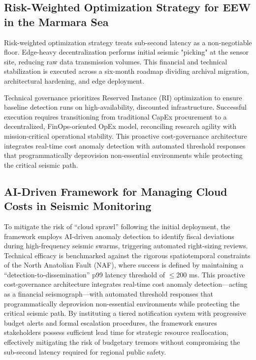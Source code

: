 \documentclass[data,article,accept,pdftex,moreauthors]{Definitions/mdpi}
\begin{document}
\subsection{Risk-Weighted Optimization Strategy for EEW in the Marmara Sea}
Risk-weighted optimization strategy treats sub-second latency as a non-negotiable floor. Edge-heavy decentralization performs initial seismic "picking" at the sensor site, reducing raw data transmission volumes. This financial and technical stabilization is executed across a six-month roadmap dividing archival migration, architectural hardening, and edge deployment.

Technical governance prioritizes Reserved Instance (RI) optimization to ensure baseline detection runs on high-availability, discounted infrastructure. Successful execution requires transitioning from traditional CapEx procurement to a decentralized, FinOps-oriented OpEx model, reconciling research agility with mission-critical operational stability. This proactive cost-governance architecture integrates real-time cost anomaly detection with automated threshold responses that programmatically deprovision non-essential environments while protecting the critical seismic path.

\subsection{AI-Driven Framework for Managing Cloud Costs in Seismic Monitoring}
To mitigate the risk of ``cloud sprawl'' following the initial deployment, the framework employs AI-driven anomaly detection to identify fiscal deviations during high-frequency seismic swarms, triggering automated right-sizing reviews. Technical efficacy is benchmarked against the rigorous spatiotemporal constraints of the North Anatolian Fault (NAF), where success is defined by maintaining a ``detection-to-dissemination'' p99 latency threshold of $\leq$200 ms. This proactive cost-governance architecture integrates real-time cost anomaly detection---acting as a financial seismograph---with automated threshold responses that programmatically deprovision non-essential environments while protecting the critical seismic path. By instituting a tiered notification system with progressive budget alerts and formal escalation procedures, the framework ensures stakeholders possess sufficient lead time for strategic resource reallocation, effectively mitigating the risk of budgetary tremors without compromising the sub-second latency required for regional public safety.
\end{document}
